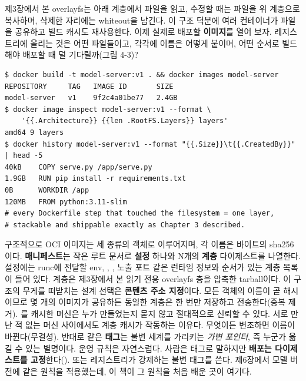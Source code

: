 제3장에서 본 overlayfs는 아래 계층에서 파일을 읽고, 수정할 때는 파일을 위 계층으로 복사하며, 삭제한 자리에는 whiteout을 남긴다. 이 구조 덕분에 여러 컨테이너가 파일을 공유하고 빌드 캐시도 재사용한다. 이제 실제로 배포할 \textbf{이미지}를 열어 보자. 레지스트리에 올리는 것은 어떤 파일들이고, 각각에 이름은 어떻게 붙이며, 어떤 순서로 빌드해야 배포할 때 덜 기다릴까(그림 4-3)?

\begin{terminalbox}
\begin{Verbatim}[breaklines=true,breakanywhere=true,fontsize=\small,formatcom=\color{tbbtermfg},codes=\tbbcodeactive]
$ docker build -t model-server:v1 . && docker images model-server
REPOSITORY     TAG   IMAGE ID       SIZE
model-server   v1    9f2c4a01be77   2.4GB
$ docker image inspect model-server:v1 --format \
    '{{.Architecture}} {{len .RootFS.Layers}} layers'
amd64 9 layers
$ docker history model-server:v1 --format "{{.Size}}\t{{.CreatedBy}}" | head -5
40kB    COPY serve.py /app/serve.py
1.9GB   RUN pip install -r requirements.txt
0B      WORKDIR /app
120MB   FROM python:3.11-slim
# every Dockerfile step that touched the filesystem = one layer,
# stackable and shippable exactly as Chapter 3 described.
\end{Verbatim}
\end{terminalbox}

구조적으로 OCI 이미지는 세 종류의 객체로 이루어지며, 각 이름은 바이트의 sha256이다. \textbf{매니페스트}는 작은 루트 문서로 \textbf{설정} 하나와 N개의 \textbf{계층} 다이제스트를 나열한다. 설정에는 runc에 전달할 env, , , 노출 포트 같은 런타임 정보와 순서가 있는 계층 목록이 들어 있다. 계층은 제3장에서 본 읽기 전용 overlayfs 층을 압축한 tarball이다. 이 구조의 무게를 떠받치는 설계 선택은 \textbf{콘텐츠 주소 지정}이다. 모든 객체의 이름이 곧 해시이므로 몇 개의 이미지가 공유하든 동일한 계층은 한 번만 저장하고 전송한다(중복 제거). 를 캐시한 머신은 누가 만들었는지 묻지 않고 절대적으로 신뢰할 수 있다. 서로 만난 적 없는 머신 사이에서도 계층 캐시가 작동하는 이유다. 무엇이든 변조하면 이름이 바뀐다(무결성). 반대로  같은 \textbf{태그}는 불변 세계를 가리키는 \textit{가변 포인터}, 즉 누군가 옮길 수 있는 별명이다. 운영 규칙은 자연스럽다. 사람은 태그로 말하지만 \textbf{배포는 다이제스트를 고정}한다(). 또는 레지스트리가 강제하는 불변 태그를 쓴다. 제6장에서 모델 버전에 같은 원칙을 적용했는데, 이 책이 그 원칙을 처음 배운 곳이 여기다.

